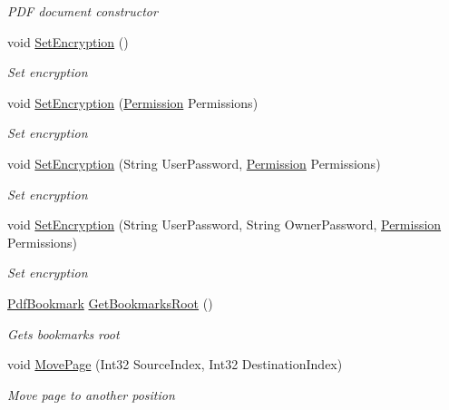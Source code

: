 \begin{DoxyCompactItemize}
\begin{DoxyCompactList}\small\item\em P\+DF document constructor \end{DoxyCompactList}\item 
void \hyperlink{class_pdf_file_writer_1_1_pdf_document_af6c69bef14c144f36292577e7b76cd1b}{Set\+Encryption} ()
\begin{DoxyCompactList}\small\item\em Set encryption \end{DoxyCompactList}\item 
void \hyperlink{class_pdf_file_writer_1_1_pdf_document_a73bab373911f7257fe73350df55eb720}{Set\+Encryption} (\hyperlink{namespace_pdf_file_writer_a10f216f5352bb45a6ed502a96ccdf5d7}{Permission} Permissions)
\begin{DoxyCompactList}\small\item\em Set encryption \end{DoxyCompactList}\item 
void \hyperlink{class_pdf_file_writer_1_1_pdf_document_a424dc43077b7c16f1c3efaf071bdfe4f}{Set\+Encryption} (String User\+Password, \hyperlink{namespace_pdf_file_writer_a10f216f5352bb45a6ed502a96ccdf5d7}{Permission} Permissions)
\begin{DoxyCompactList}\small\item\em Set encryption \end{DoxyCompactList}\item 
void \hyperlink{class_pdf_file_writer_1_1_pdf_document_a8feffe00b5cca70993a66ddaaa1e6604}{Set\+Encryption} (String User\+Password, String Owner\+Password, \hyperlink{namespace_pdf_file_writer_a10f216f5352bb45a6ed502a96ccdf5d7}{Permission} Permissions)
\begin{DoxyCompactList}\small\item\em Set encryption \end{DoxyCompactList}\item 
\hyperlink{class_pdf_file_writer_1_1_pdf_bookmark}{Pdf\+Bookmark} \hyperlink{class_pdf_file_writer_1_1_pdf_document_a9cdcc24eb8ded1e6d147db8cf099e85f}{Get\+Bookmarks\+Root} ()
\begin{DoxyCompactList}\small\item\em Gets bookmarks root \end{DoxyCompactList}\item 
void \hyperlink{class_pdf_file_writer_1_1_pdf_document_a48a3ff9d818b259cda0538ef55cf2535}{Move\+Page} (Int32 Source\+Index, Int32 Destination\+Index)
\begin{DoxyCompactList}\small\item\em Move page to another position \end{DoxyCompactList}\item 

\end{DoxyCompactItemize}
